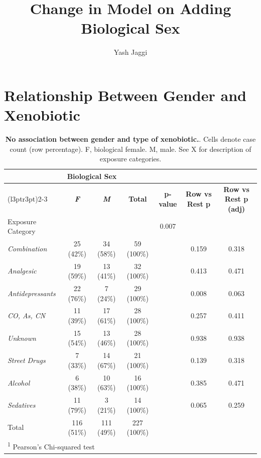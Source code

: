 \documentclass[
]{article}
\title{Change in Model on Adding Biological Sex}
\author{Yash Jaggi}
\date{}
\begin{document}
\maketitle

\section*{Relationship Between Gender and Xenobiotic}\label{relationship-between-gender-and-xenobiotic}

\begin{table}[!h]
\centering
\caption{\label{tab:table1}\textbf{No association between gender and type of xenobiotic.}. Cells denote case count (row percentage). F, biological female. M, male. See X for description of exposure categories.}
\centering
\begin{tabular}[t]{lcccccc}
\toprule
\multicolumn{1}{c}{ } & \multicolumn{2}{c}{Biological Sex} & \multicolumn{4}{c}{ } \\
\cmidrule(l{3pt}r{3pt}){2-3}
\textbf{} & \textbf{\textit{F}} & \textbf{\textit{M}} & \textbf{Total} & \textbf{p-value} & \textbf{\textbf{Row vs Rest p}} & \textbf{\textbf{Row vs Rest p (adj)}}\\
\midrule
Exposure Category &  &  &  & 0.007 &  & \\
\hspace{1em}\em{Combination} & 25 (42\%) & 34 (58\%) & 59 (100\%) &  & 0.159 & 0.318\\
\hspace{1em}\em{Analgesic} & 19 (59\%) & 13 (41\%) & 32 (100\%) &  & 0.413 & 0.471\\
\hspace{1em}\em{Antidepressants} & 22 (76\%) & 7 (24\%) & 29 (100\%) &  & 0.008 & 0.063\\
\hspace{1em}\em{CO, As, CN} & 11 (39\%) & 17 (61\%) & 28 (100\%) &  & 0.257 & 0.411\\
\addlinespace
\hspace{1em}\em{Unknown} & 15 (54\%) & 13 (46\%) & 28 (100\%) &  & 0.938 & 0.938\\
\hspace{1em}\em{Street Drugs} & 7 (33\%) & 14 (67\%) & 21 (100\%) &  & 0.139 & 0.318\\
\hspace{1em}\em{Alcohol} & 6 (38\%) & 10 (63\%) & 16 (100\%) &  & 0.385 & 0.471\\
\hspace{1em}\em{Sedatives} & 11 (79\%) & 3 (21\%) & 14 (100\%) &  & 0.065 & 0.259\\
Total & 116 (51\%) & 111 (49\%) & 227 (100\%) &  &  & \\
\bottomrule
\multicolumn{7}{l}{\rule{0pt}{1em}\textsuperscript{1} Pearson's Chi-squared test}\\
\end{tabular}
\end{table}
\end{document}
